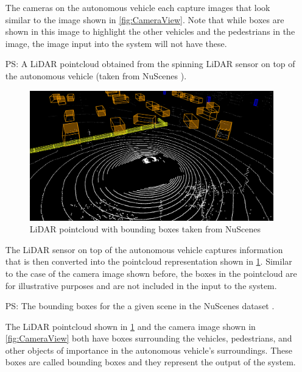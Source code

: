 \documentclass[12pt]{article}
\newcounter{psysnum} %
\begin{document}
\begin{itemize}
The cameras on the autonomous vehicle each capture images that look similar to the image shown in \ref{fig:CameraView}. Note that while boxes are shown
in this image to highlight the other vehicles and the pedestrians in the image, the image input into the system will not have these.

\item [PS\refstepcounter{psysnum}\thepsysnum \label{LiDAR Pointclouds}:] A LiDAR pointcloud obtained from the spinning LiDAR sensor on top of the autonomous vehicle (taken from NuScenes \cite{caesar2020nuscenes}).
\begin{figure}[H]
  \centering
  \includegraphics[width=15cm]{LiDAR_View.png}
  \caption{LiDAR pointcloud with bounding boxes taken from NuScenes}\label{fig:LiDARView}
\end{figure}

The LiDAR sensor on top of the autonomous vehicle captures information that is then converted into the pointcloud representation shown in \ref{fig:LiDARView}.
Similar to the case of the camera image shown before, the boxes in the pointcloud are for illustrative purposes and are not included in the input to the system.

\item [PS\refstepcounter{psysnum}\thepsysnum \label{Bounding Boxes}:] The bounding boxes for the a given scene in the NuScenes dataset \cite{caesar2020nuscenes}.

The LiDAR pointcloud shown in \ref{fig:LiDARView} and the camera image shown in \ref{fig:CameraView} both have boxes surrounding the vehicles,
pedestrians, and other objects of importance in the autonomous vehicle's surroundings. These boxes are called bounding boxes and they represent
the output of the system.

\end{itemize}
\end{document}
